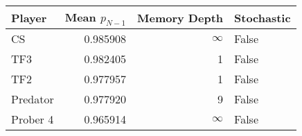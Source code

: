 \begin{tabular}{lrrl}
\toprule
   Player &  Mean $p_{N-1}$ &  Memory Depth & Stochastic \\
\midrule
       CS &        0.985908 &            \(\infty\) &      False \\
      TF3 &        0.982405 &             1 &      False \\
      TF2 &        0.977957 &             1 &      False \\
 Predator &        0.977920 &             9 &      False \\
 Prober 4 &        0.965914 &            \(\infty\) &      False \\
\bottomrule
\end{tabular}
